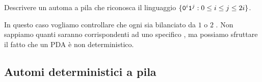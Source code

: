 \begin{Exercise}[label=fra-il-doppio]
	Descrivere un automa a pila che riconosca il linguaggio $\{\mathtt{0}^{i}\mathtt{1}^{j}: 0\le i\le j\le 2i\}$.
\end{Exercise}

\begin{Answer}
	In questo caso vogliamo controllare che ogni \zero sia bilanciato da $1$ o $2$ \uno.
	Non sappiamo quanti \uno saranno corrispondenti ad uno specifico \zero, ma possiamo sfruttare il fatto che un PDA è non deterministico.
\end{Answer}



\subsection{Automi deterministici a pila}\label{sec:DPDA}

